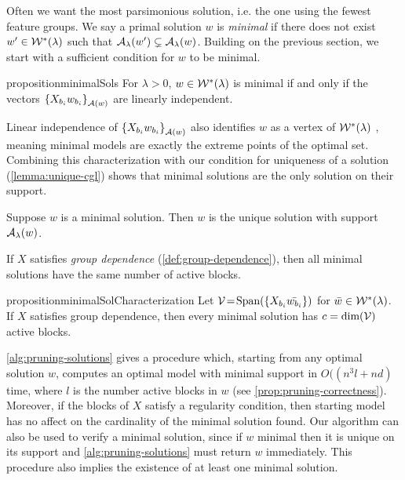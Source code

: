 Often we want the most parsimonious solution, i.e. the one
using the fewest feature groups.
We say a primal solution \( w \) is \emph{minimal} if there
does not exist \( w' \in \mathcal{W}^*(\lambda) \) such that
\( {\mathcal{A}_{\lambda}}(w') \subsetneq {\mathcal{A}_{\lambda}}(w) \).
Building on the previous section, we start with a sufficient
condition for \( w \) to be minimal.
\begin{restatable}{proposition}{minimalSols}\label{prop:minimal-solutions}
    For \( \lambda > 0 \), \( w \in \mathcal{W}^*(\lambda) \) is minimal if and only
    if the vectors \( \left\{X_{b_i} w_{b_i}\right\}_{\mathcal{A}(w)} \) are linearly independent.
\end{restatable}

Linear independence of \( \left\{X_{b_i} w_{b_i}\right\}_{\mathcal{A}(w)} \)
also identifies \( w \) as a vertex of \( \mathcal{W}^*(\lambda) \)
\citep{bertsekas2009convex},
meaning minimal models are exactly the extreme points of the optimal set.
Combining this characterization with our condition
for uniqueness of a solution (\cref{lemma:unique-cgl}) shows that
minimal solutions are the only solution on their support.

\begin{corollary}\label{cor:minimal-unique}
    Suppose \( w \) is a minimal solution.
    Then \( w \) is the unique solution with support \( {\mathcal{A}_{\lambda}}(w) \).
\end{corollary}

If \( X \) satisfies \emph{group dependence}
(\cref{def:group-dependence}), then all minimal solutions have the same
number of active blocks.

\begin{restatable}{proposition}{minimalSolCharacterization}\label{prop:minimal-sol-characterization}
    Let \( \mathcal{V} \!=\! \text{Span}(\left\{X_{b_i} \bar {w_{b_i}}\right\}) \) for \( \bar w \in \mathcal{W}^*(\lambda) \).
    If \( X \) satisfies group dependence, then every minimal solution has
    \( c = \text{dim}(\mathcal{V}) \) active blocks.
\end{restatable}



\cref{alg:pruning-solutions} gives a procedure which, starting from
any optimal solution \( w \), computes an optimal model with minimal
support in \( O((n^3 l + nd) \) time, where \( l \)
is the number active blocks in \( w \)
(see \cref{prop:pruning-correctness}).
Moreover, if the blocks of \( X \) satisfy a regularity condition, then
starting model has no affect on the cardinality of the minimal solution found.
Our algorithm can also be used to verify a minimal solution, since
if \( w \) minimal then it is unique on its support and
\cref{alg:pruning-solutions} must return \( w \) immediately.
This procedure also implies the existence of at least one minimal
solution.

